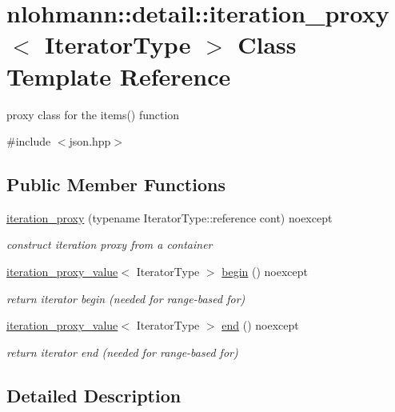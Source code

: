 \hypertarget{classnlohmann_1_1detail_1_1iteration__proxy}{}\section{nlohmann\+::detail\+::iteration\+\_\+proxy$<$ Iterator\+Type $>$ Class Template Reference}
\label{classnlohmann_1_1detail_1_1iteration__proxy}


proxy class for the items() function  




{\ttfamily \#include $<$json.\+hpp$>$}

\subsection*{Public Member Functions}
\begin{DoxyCompactItemize}
\item 
\mbox{\hyperlink{classnlohmann_1_1detail_1_1iteration__proxy_afe257e972e3b4658ef2e355f7389d4a5}{iteration\+\_\+proxy}} (typename Iterator\+Type\+::reference cont) noexcept
\begin{DoxyCompactList}\small\item\em construct iteration proxy from a container \end{DoxyCompactList}\item 
\mbox{\hyperlink{classnlohmann_1_1detail_1_1iteration__proxy__value}{iteration\+\_\+proxy\+\_\+value}}$<$ Iterator\+Type $>$ \mbox{\hyperlink{classnlohmann_1_1detail_1_1iteration__proxy_a379f86709d340c4ab1995539b8af623d}{begin}} () noexcept
\begin{DoxyCompactList}\small\item\em return iterator begin (needed for range-\/based for) \end{DoxyCompactList}\item 
\mbox{\hyperlink{classnlohmann_1_1detail_1_1iteration__proxy__value}{iteration\+\_\+proxy\+\_\+value}}$<$ Iterator\+Type $>$ \mbox{\hyperlink{classnlohmann_1_1detail_1_1iteration__proxy_a90091f8492d23576edef72c5e8b9d4cf}{end}} () noexcept
\begin{DoxyCompactList}\small\item\em return iterator end (needed for range-\/based for) \end{DoxyCompactList}\end{DoxyCompactItemize}


\subsection{Detailed Description}
